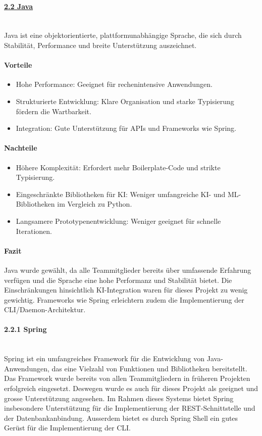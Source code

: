 \documentclass[a4paper,12pt]{report}
\begin{document}
    \paragraph*{\underline{2.2 Java}}\mbox{}\\
    Java ist eine objektorientierte, plattformunabhängige Sprache, die sich durch Stabilität, Performance und breite Unterstützung auszeichnet.

    \paragraph*{Vorteile}
    \begin{itemize}
        \item Hohe Performance: Geeignet für rechenintensive Anwendungen.
        \item Strukturierte Entwicklung: Klare Organisation und starke Typisierung fördern die Wartbarkeit.
        \item Integration: Gute Unterstützung für APIs und Frameworks wie Spring.
    \end{itemize}

    \paragraph*{Nachteile}
    \begin{itemize}
        \item Höhere Komplexität: Erfordert mehr Boilerplate-Code und strikte Typisierung.
        \item Eingeschränkte Bibliotheken für KI: Weniger umfangreiche KI- und ML-Bibliotheken im Vergleich zu Python.
        \item Langsamere Prototypenentwicklung: Weniger geeignet für schnelle Iterationen.
    \end{itemize}

    \paragraph*{Fazit}
    Java wurde gewählt, da alle Teammitglieder bereits über umfassende Erfahrung verfügen und die Sprache eine hohe Performanz und Stabilität bietet.
    Die Einschränkungen hinsichtlich KI-Integration waren für dieses Projekt zu wenig gewichtig.
    Frameworks wie Spring erleichtern zudem die Implementierung der CLI/Daemon-Architektur.

    \paragraph*{2.2.1 Spring}\mbox{}\\
    Spring ist ein umfangreiches Framework für die Entwicklung von Java-Anwendungen, das eine Vielzahl von Funktionen und Bibliotheken bereitstellt.
    Das Framework wurde bereits von allen Teammitgliedern in früheren Projekten erfolgreich eingesetzt.
    Deswegen wurde es auch für dieses Projekt als geeignet und grosse Unterstützung angesehen.
    Im Rahmen dieses Systems bietet Spring insbesondere Unterstützung für die Implementierung der REST-Schnittstelle und der Datenbankanbindung.
    Ausserdem bietet es durch Spring Shell ein gutes Gerüst für die Implementierung der CLI\@.
\end{document}
